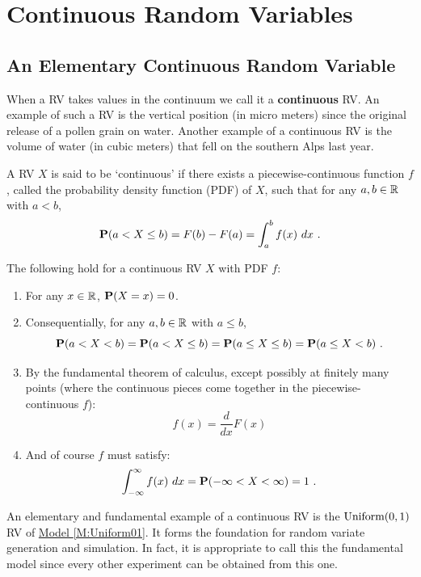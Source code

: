 

\section{Continuous Random Variables}
\subsection{An Elementary Continuous Random Variable}\label{S:ElemContRV}

When a RV takes values in the continuum we call it a {\bf continuous} RV.  An example of such a RV is the vertical position (in micro meters) since the original release of a pollen grain on water.  Another example of a continuous RV is the volume of water (in cubic meters) that fell on the southern Alps last year.  
\begin{definition}
A RV $X$ is said to be `continuous' if there exists a piecewise-continuous function $f$, called the probability density function (PDF) of $X$, such that for any $a, b \in \mathbb{R}$ with $a < b$,
\[
\mathbf{P}(a < X \leq b) = F(b)-F(a) = \int_a^b f(x) \ dx \ .
\]
\end{definition}
The following hold for a continuous RV $X$ with PDF $f$:
\begin{enumerate}
\item For any $x \in \mathbb{R}$, $\mathbf{P}(X=x)=0$.
\item Consequentially, for any $a,b \in \mathbb{R}$ with $a \leq b$,
\[
\mathbf{P}(a < X < b ) = \mathbf{P}(a < X \leq b) = \mathbf{P}(a \leq X \leq b) = \mathbf{P}(a \leq X < b) \ .
\]
\item By the fundamental theorem of calculus, except possibly at finitely many points (where the continuous pieces come together in the piecewise-continuous $f$):
\[
f(x) = \frac{d}{dx} F(x)
\]
\item And of course $f$ must satisfy:
\[
\int_{-\infty}^{\infty} f(x) \ dx = \mathbf{P}(-\infty < X < \infty) = 1 \ .
\] 
\end{enumerate}

An elementary and fundamental example of a continuous RV is the $\mbox{{\rm Uniform}}(0,1)$ RV of \hyperref[M:Uniform01]{Model \ref*{M:Uniform01}}.  It forms the foundation for random variate generation and simulation.  In fact, it is appropriate to call this the fundamental model since every other experiment can be obtained from this one.

